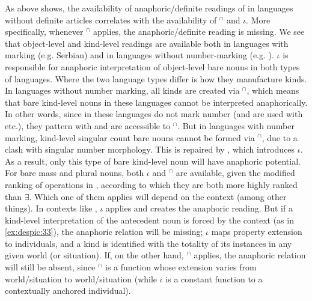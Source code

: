 \documentclass[output=paper,
modfonts
]{langscibook}
\begin{document}
	As  above shows, the availability of anaphoric/definite readings of  in languages without definite articles correlates with the availability of $^\cap$ and $\iota$. More specifically, whenever $^\cap$ applies, the anaphoric/definite reading is missing. We see that object-level and kind-level readings are available both in languages with  marking (e.g. Serbian) and in languages without number-marking (e.g. ). $\iota$ is responsible for anaphoric interpretation of object-level bare nouns in both types of languages. Where the two language types differ is how they manufacture kinds. In languages without number marking, all kinds are created via $^\cap$, which means that bare kind-level nouns in these languages cannot be interpreted anaphorically. In other words, since  in these languages do not mark number (and are used with  etc.), they pattern with  and are accessible to $^\cap$. But in languages with number marking, kind-level singular count bare nouns cannot be formed via $^\cap$, due to a clash with singular number morphology. This is repaired by , which introduces $\iota$. As a result, only this type of bare kind-level noun will have anaphoric potential. For bare mass and plural nouns, both $\iota$ and $^\cap$ are available, given the modified ranking of operations in , according to which they are both more highly ranked than $\exists$. 
	Which one of them applies will depend on the context (among other things). In contexts like , $\iota$ applies and creates the anaphoric reading. But if a kind-level interpretation of the antecedent noun is forced by the context (as in \ref{ex:despic:33}), the anaphoric relation will be missing; $\iota$ maps property extension to individuals, and a kind is identified with the totality of its instances in any given world (or situation). If, on the other hand, $^\cap$ applies, the anaphoric relation will still be absent, since $^\cap$ is a function whose extension varies from world/situation to world/situation (while $\iota$ is a constant function to a contextually anchored individual).
	
\end{document}
